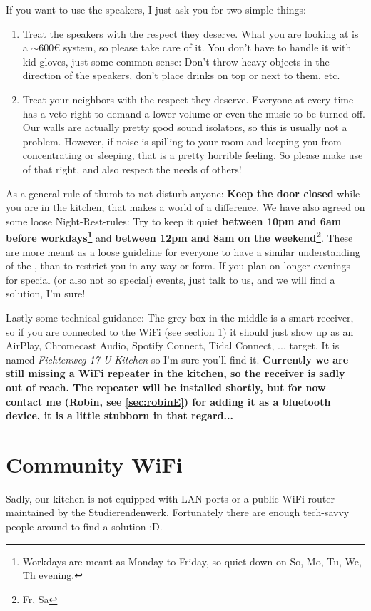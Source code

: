 If you want to use the speakers, I just ask you for two simple things:
\begin{enumerate}
    \item Treat the speakers with the respect they deserve. What you are looking at is a $\sim$600€ system, so please take care of it. You don't have to handle it with kid gloves, just some common sense: Don't throw heavy objects in the direction of the speakers, don't place drinks on top or next to them, etc.
    \item Treat your neighbors with the respect they deserve. Everyone at every time has a veto right to demand a lower volume or even the music to be turned off. Our walls are actually pretty good sound isolators, so this is usually not a problem. However, if noise is spilling to your room and keeping you from concentrating or sleeping, that is a pretty horrible feeling. So please make use of that right, and also respect the needs of others!
\end{enumerate}

As a general rule of thumb to not disturb anyone: \textbf{Keep the door closed} while you are in the kitchen, that makes a world of a difference. We have also agreed on some loose Night-Rest-rules: Try to keep it quiet \textbf{between 10pm and 6am before workdays\footnote{Workdays are meant as Monday to Friday, so quiet down on So, Mo, Tu, We, Th evening.}} and \textbf{between 12pm and 8am on the weekend\footnote{Fr, Sa}}. These  are more meant as a loose guideline for everyone to have a similar understanding of the , than to restrict you in any way or form. If you plan on longer evenings for special (or also not so special) events, just talk to us, and we will find a solution, I'm sure!

Lastly some technical guidance: The grey box in the middle is a smart receiver, so if you are connected to the WiFi (see section \ref{sec:wifi}) it should just show up as an AirPlay, Chromecast Audio, Spotify Connect, Tidal Connect, ... target. It is named \textit{Fichtenweg 17 U Kitchen} so I'm sure you'll find it. \textbf{Currently we are still missing a WiFi repeater in the kitchen, so the receiver is sadly out of reach. The repeater will be installed shortly, but for now contact me (Robin, see \ref{sec:robinE}) for adding it as a bluetooth device, it is a little stubborn in that regard...}

\section{Community WiFi} \label{sec:wifi}
Sadly, our kitchen is not equipped with LAN ports or a public WiFi router maintained by the Studierendenwerk. Fortunately there are enough tech-savvy people around to find a solution :D.

